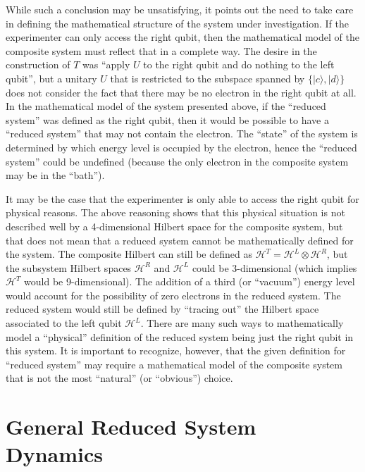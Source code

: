 While such a conclusion may be unsatisfying, it points out the need to take care in defining the mathematical structure of the system under investigation.  If the experimenter can only access the right qubit, then the mathematical model of the composite system must reflect that in a complete way.  The desire in the construction of $T$ was ``apply $U$ to the right qubit and do nothing to the left qubit'', but a unitary $U$ that is restricted to the subspace spanned by $\{|c\rangle,|d\rangle\}$ does not consider the fact that there may be no electron in the right qubit at all.  In the mathematical model of the system presented above, if the ``reduced system'' was defined as the right qubit, then it would be possible to have a ``reduced system'' that may not contain the electron.  The ``state'' of the system is determined by which energy level is occupied by the electron, hence the ``reduced system'' could be undefined (because the only electron in the composite system may be in the ``bath'').

It may be the case that the experimenter is only able to access the right qubit for physical reasons.  The above reasoning shows that this physical situation is not described well by a 4-dimensional Hilbert space for the composite system, but that does not mean that a reduced system cannot be mathematically defined for the system.  The composite Hilbert can still be defined as $\mathcal{H}^T = \mathcal{H}^L\otimes\mathcal{H}^R$, but the subsystem Hilbert spaces $\mathcal{H}^R$ and $\mathcal{H}^L$ could be 3-dimensional (which implies $\mathcal{H}^T$ would be 9-dimensional).  The addition of a third (or ``vacuum'') energy level would account for the possibility of zero electrons in the reduced system.  The reduced system would still be defined by ``tracing out'' the Hilbert space associated to the left qubit $\mathcal{H}^L$.  There are many such ways to mathematically model a ``physical'' definition of the reduced system being just the right qubit in this system.  It is important to recognize, however, that the given definition for ``reduced system'' may require a mathematical model of the composite system that is not the most ``natural'' (or ``obvious'') choice.

\section{General Reduced System Dynamics}
\label{sec:genreddynamics}

